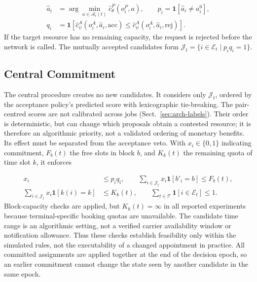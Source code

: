 \documentclass[a4paper]{llncs}
\begin{document}
\begin{equation}
\begin{aligned}
\hat a_i&=\arg\min_{a\in\mathcal A_i(t)}
\hat c_{\theta}^{P}(o_i^P,a),\qquad
p_i=\mathbf 1[\hat a_i\ne a_i^0],\\
q_i&=\mathbf 1\!\left[
\hat c_{\psi}^{A}(o_i^A,\hat a_i,\mathrm{acc})
\le
\hat c_{\psi}^{A}(o_i^A,\hat a_i,\mathrm{rej})
\right].
\end{aligned}
\end{equation}
If the target resource has no remaining capacity, the request is
rejected before the network is called. The mutually accepted candidates
form $\mathcal J_t=\{i\in\mathcal E_t\mid p_iq_i=1\}$.

\subsection{Central Commitment}
\label{sec:arch-commit}
The central procedure creates no new candidates. It considers only
$\mathcal J_t$, ordered by the acceptance policy's predicted score with
lexicographic tie-breaking. The pair-centred scores are not calibrated
across jobs (Sect.~\ref{sec:arch-labels}). Their order is deterministic,
but can change which proposals obtain a contested resource; it is
therefore an algorithmic priority, not a validated ordering of monetary
benefits. Its effect must be separated from the acceptance veto. With $x_i\in\{0,1\}$ indicating commitment,
$F_b(t)$ the free slots in block $b$, and $K_k(t)$ the remaining quota
of time slot $k$, it enforces

\begin{equation}
\begin{aligned}
x_i&\le p_iq_i,\qquad
\sum_{i\in\mathcal J_t}\!x_i\mathbf1[b'_i\!=\!b]\le F_b(t),\\
\sum_{i\in\mathcal J_t}\!x_i\mathbf1[k(i)\!=\!k]&\le K_k(t),\qquad
\sum_{t\in\mathcal T}\!\mathbf1[i\in\mathcal E_t]\le1.
\end{aligned}
\end{equation}
Block-capacity checks are applied, but $K_k(t)=\infty$ in all reported
experiments because terminal-specific booking quotas are unavailable.
The candidate time range is an algorithmic setting, not a verified
carrier availability window or notification allowance. Thus these
checks establish feasibility only within the simulated rules, not
the executability of a changed appointment in practice. All committed assignments are applied together at the end of
the decision epoch, so an earlier commitment cannot change the state
seen by another candidate in the same epoch.
\end{document}
